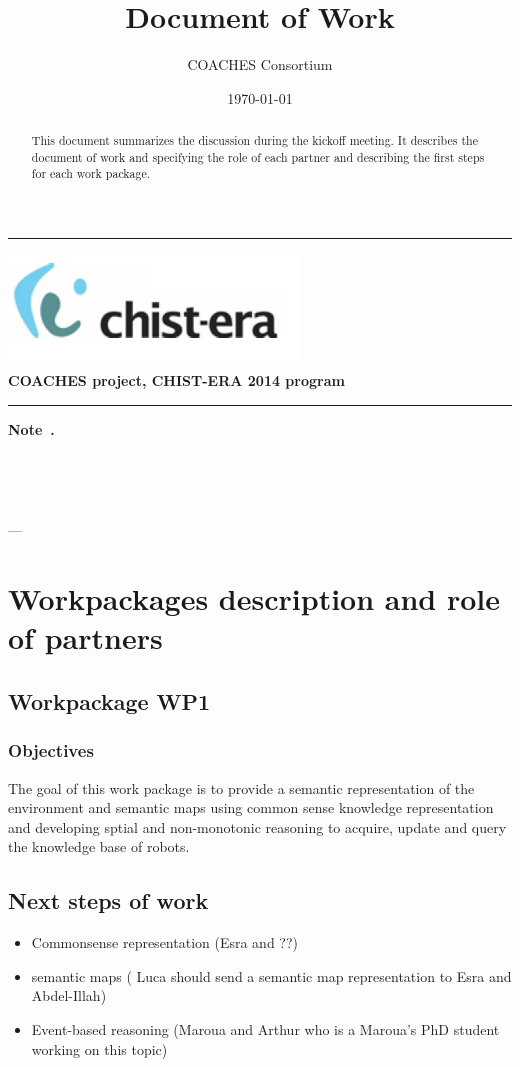 \documentclass{article}
\title{ Document of Work }
\author{COACHES Consortium}
\date{\today}
\newcommand{\makemadtitle}{
  \hrule
  \vspace{.5em}
  \noindent
  \begin{center}
  \textbf{
  {\centering\includegraphics[height=3cm,bb=0 0 371 145]{../logoCHISTERA2014.png}}\\
   {\centering\Large COACHES project, CHIST-ERA 2014 program}
  }
  \end{center}
  \vspace{.5em}
 
  \hrule
  \vspace{3em}
  \begin{center}
    \begin{large}\textbf{ Note~\usebox{\notenumber}.}\end{large}\\[.5em]
    \begin{Large}\textbf{\usebox{\notetitle}}\end{Large}\\[2em]
    \begin{large}\usebox{\noteauthor} --- \usebox{\notedate}\end{large}
  \end{center}
  \vspace{3em}
}
\begin{document}
\makemadtitle

\vspace*{1.0in}
\begin{abstract}
 This document summarizes the discussion during the kickoff meeting. It describes the document of work and specifying the role of each partner and describing the first steps for each work package.
  \end{abstract}

\vspace*{1.5in}

\newpage

\section{Workpackages description and role of partners}
\subsection{Workpackage WP1}
\subsubsection*{Objectives}
The goal of this work package is to provide a semantic representation of the environment and semantic maps using common sense knowledge representation and developing sptial and non-monotonic reasoning to acquire, update and query the knowledge base of robots. 
\subsection*{Next steps of work}
\begin{itemize}
\item Commonsense representation (Esra and ??)
\item semantic maps ( Luca should send a semantic map representation to Esra and Abdel-Illah)
\item Event-based reasoning (Maroua and Arthur who is a Maroua's PhD student working on this topic)
\end{itemize}
\end{document}
